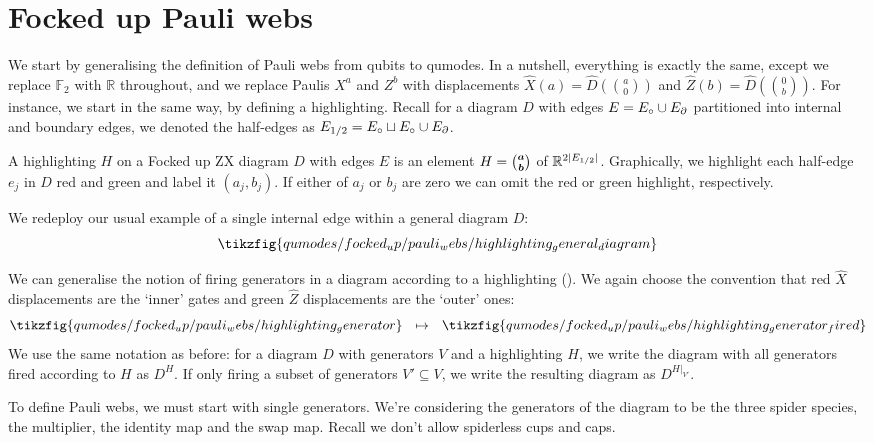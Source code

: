 \section{Focked up Pauli webs}\label{sec:focked-up-pauli-webs}

We start by generalising the definition of Pauli webs from qubits to qumodes.
In a nutshell, everything is exactly the same, except we replace $\mathbb{F}_2$ with $\mathbb{R}$ throughout, and we replace Paulis $X^a$ and $Z^b$ with displacements $\hat{X}(a) = \hat{D}(\binom{a}{0})$ and $\hat{Z}(b) = \hat{D}(\binom{0}{b})$.
For instance, we start in the same way, by defining a highlighting.
Recall for a diagram $D$ with edges $E = E_\circ \cup E_{\partial}$ partitioned into internal and boundary edges, we denoted the half-edges as $E_{1/2} = E_\circ \sqcup E_\circ \cup E_{\partial}$.

\begin{definition}
    A highlighting $H$ on a Focked up ZX diagram $D$ with edges $E$ is an element $H = \tbinom{\boldsymbol{a}}{\boldsymbol{b}}$ of $\mathbb{R}^{2|E_{1/2}|}$.
    Graphically, we highlight each half-edge $e_j$ in $D$ red and green and label it $(a_j, b_j)$.
    If either of $a_j$ or $b_j$ are zero we can omit the red or green highlight, respectively.
\end{definition}

We redeploy our usual example of a single internal edge within a general diagram $D$:
\begin{equation}\label{eq:highlighting_general_diagram}
\tikzfig{qumodes/focked_up/pauli_webs/highlighting_general_diagram}
\end{equation}

We can generalise the notion of firing generators in a diagram according to a highlighting ().
We again choose the convention that red $\hat{X}$ displacements are the `inner' gates and green $\hat{Z}$ displacements are the `outer' ones:
\begin{equation}
    \tikzfig{qumodes/focked_up/pauli_webs/highlighting_generator}
    ~~\mapsto~~
    \tikzfig{qumodes/focked_up/pauli_webs/highlighting_generator_fired}
\end{equation}
We use the same notation as before: for a diagram $D$ with generators $V$ and a highlighting $H$, we write the diagram with all generators fired according to $H$ as $D^H$.
If only firing a subset of generators $V' \subseteq V$, we write the resulting diagram as $D^{H|_{V'}}$.

To define Pauli webs, we must start with single generators.
We're considering the generators of the diagram to be the three spider species, the multiplier, the identity map and the swap map.
Recall we don't allow spiderless cups and caps.

